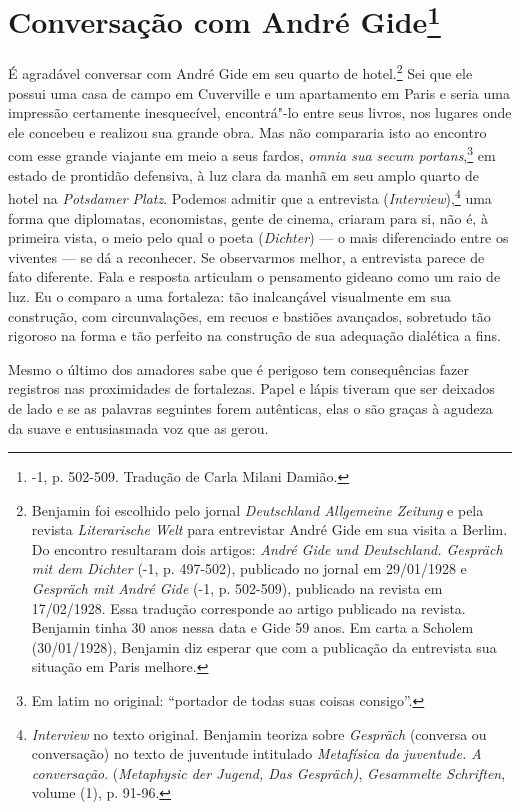 \chapter{Conversação com André Gide\footnote[*]{-1, p. 502-509. Tradução de
  Carla Milani Damião.}}

É agradável conversar com André Gide em seu quarto de hotel.\footnote{Benjamin
  foi escolhido pelo jornal \emph{Deutschland Allgemeine Zeitung} e pela
  revista \emph{Literarische Welt} para entrevistar André Gide em sua
  visita a Berlim. Do encontro resultaram dois artigos: \emph{André Gide
  und Deutschland. Gespräch mit dem Dichter} (-1, p. 497-502),
  publicado no jornal em 29/01/1928 e \emph{Gespräch mit André Gide}
  (-1, p. 502-509), publicado na revista em 17/02/1928. Essa
  tradução corresponde ao artigo publicado na revista. Benjamin tinha 30
  anos nessa data e Gide 59 anos. Em carta a Scholem (30/01/1928),
  Benjamin diz esperar que com a publicação da entrevista sua situação
  em Paris melhore. \versal{[N. T.]}} Sei que ele possui uma casa de campo em Cuverville e um
apartamento em Paris e seria uma impressão certamente inesquecível,
encontrá"-lo entre seus livros, nos lugares onde ele concebeu e realizou
sua grande obra. Mas não compararia isto ao encontro com esse grande
viajante em meio a seus fardos, \emph{omnia sua secum portans},\footnote{Em latim no original: ``portador de todas suas coisas consigo''. \versal{[N. T.]}} em
estado de prontidão defensiva, à luz clara da manhã em seu amplo quarto
de hotel na \emph{Potsdamer Platz}. Podemos admitir que a entrevista
(\emph{Interview}),\footnote{\emph{Interview} no texto original.
  Benjamin teoriza sobre \emph{Gespräch} (conversa ou conversação) no
  texto de juventude intitulado \emph{Metafísica da juventude. A
  conversação}. (\emph{Metaphysic der Jugend, Das Gespräch)},
  \emph{Gesammelte Schriften}, volume (1), p. 91-96. \versal{[N. T.]}} uma forma que diplomatas, economistas, gente de cinema, criaram
para si, não é, à primeira vista, o meio pelo qual o poeta
(\emph{Dichter}) --- o mais diferenciado entre os viventes --- se dá a
reconhecer. Se observarmos melhor, a entrevista parece de fato
diferente. Fala e resposta articulam o pensamento gideano como um raio
de luz. Eu o comparo a uma fortaleza: tão inalcançável visualmente em
sua construção, com circunvalações, em recuos e bastiões avançados,
sobretudo tão rigoroso na forma e tão perfeito na construção de sua
adequação dialética a fins.

Mesmo o último dos amadores sabe que é perigoso tem consequências fazer
registros nas proximidades de fortalezas. Papel e lápis tiveram que ser
deixados de lado e se as palavras seguintes forem autênticas, elas o são
graças à agudeza da suave e entusiasmada voz que as gerou.

